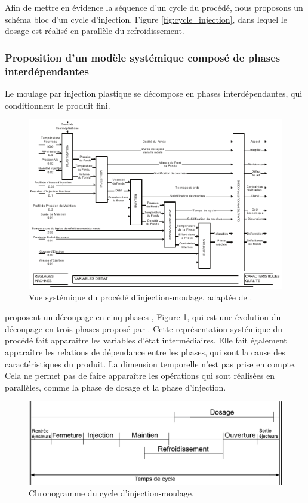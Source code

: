 Afin de mettre en évidence la séquence d’un cycle du procédé, nous proposons un schéma bloc d’un cycle d’injection, Figure \ref{fig:cycle_injection}, dans lequel le dosage est réalisé en parallèle du refroidissement.

\subsubsection{Proposition d'un modèle systémique composé de phases interdépendantes}
Le moulage par injection plastique se décompose en phases interdépendantes, qui conditionnent le produit fini.
\begin{figure}[hbtp]
	\centering
	\includegraphics[width=\textwidth,height=\textheight,keepaspectratio]{../Chap1/Figures/Kazmer_1999-Process.pdf}
	\caption{Vue systémique du procédé d'injection-moulage, adaptée de \citeauthor{kazmer_towards_1999} \cite{kazmer_towards_1999}.}
	\label{fig:kazmer_systematic}
\end{figure}
\citeauthor{kazmer_towards_1999} proposent un découpage en cinq phases \cite{kazmer_towards_1999}, Figure \ref{fig:kazmer_systematic}, qui est une  évolution du découpage en trois phases proposé par \citeauthor{ma_design_1974} \cite{ma_design_1974}.
Cette représentation systémique du procédé fait apparaître les variables d’état intermédiaires.
Elle fait également apparaître les relations de dépendance entre les phases, qui sont la cause des caractéristiques du produit.
La dimension temporelle n’est pas prise en compte.
Cela ne permet pas de faire apparaître les opérations qui sont réalisées en parallèles, comme la phase de dosage et la phase d'injection.

\begin{figure}[hbtp]
	\centering
	\includegraphics[width=\textwidth,height=\textheight,keepaspectratio]{../Chap1/Figures/SAPRISTI_Chronogramme-Simple.png}
	\caption{Chronogramme du cycle d'injection-moulage.}
	\label{fig:chronogramme}
\end{figure}

